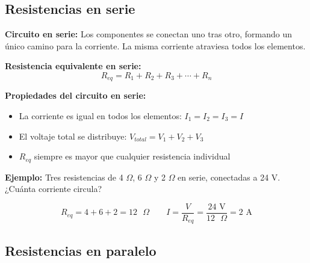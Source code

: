 \subsection{Resistencias en serie}

\begin{seccion}
\begin{definicion}
\textbf{Circuito en serie:} Los componentes se conectan uno tras otro, formando un único camino para la corriente. La misma corriente atraviesa todos los elementos.
\end{definicion}

\begin{ecuacion}
\textbf{Resistencia equivalente en serie:}
$$R_{eq} = R_1 + R_2 + R_3 + \cdots + R_n$$

\textbf{Propiedades del circuito en serie:}
\begin{itemize}
    \item La corriente es igual en todos los elementos: $I_1 = I_2 = I_3 = I$
    \item El voltaje total se distribuye: $V_{total} = V_1 + V_2 + V_3$
    \item $R_{eq}$ siempre es mayor que cualquier resistencia individual
\end{itemize}
\end{ecuacion}

\textbf{Ejemplo:} Tres resistencias de 4 $\Omega$, 6 $\Omega$ y 2 $\Omega$ en serie, conectadas a 24 V. ¿Cuánta corriente circula?

$$R_{eq} = 4 + 6 + 2 = 12 \text{ }\Omega \qquad I = \frac{V}{R_{eq}} = \frac{24 \text{ V}}{12 \text{ }\Omega} = 2 \text{ A}$$
\end{seccion}

\subsection{Resistencias en paralelo}

